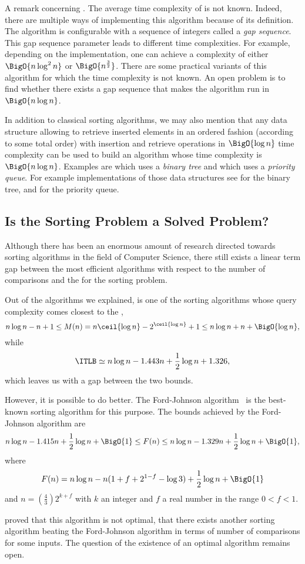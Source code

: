 A remark concerning \shellsort. The average time complexity of \shellsort is not
known. Indeed, there are multiple ways of implementing this
algorithm because of its definition. The \shellsort algorithm is configurable
with a sequence of integers called a \emph{gap sequence}. This gap sequence
parameter leads to different time complexities. For example, depending on the
implementation, one can achieve a complexity of either $\BigO{n \log^2 n}$ or
$\BigO{n^{\frac{3}{2}}}$. There are some practical variants of this algorithm
for which the time complexity is not known. An open problem is to find whether
there exists a gap sequence that makes the algorithm run in $\BigO{n \log
n}$.

In addition to classical sorting algorithms, we may also mention that any data
structure allowing to retrieve inserted elements in an ordered fashion
(according to some total order) with insertion and retrieve operations in
$\BigO{\log n}$ time complexity can be used to build an algorithm whose time
complexity is $\BigO{n \log n}$. Examples are
\binarytreesort which uses a \emph{binary tree} and
\tournamentsort which uses a \emph{priority queue}.
For example implementations of those data structures see
\citet*{sleator:1985} for the binary tree, and
\citet*{leiserson:2001} for the priority queue.


\subsection{Is the Sorting Problem a Solved Problem?}
Although there has been an enormous amount of research directed towards sorting
algorithms in the field of Computer Science, there still exists a linear term
gap between the most efficient algorithms with respect to the number of
comparisons and the \ITLB for the sorting problem.

Out of the algorithms we explained, \mergesort is one of the
sorting algorithms whose query complexity comes closest
to the \ITLB, \ie
\begin{displaymath}
n \log n - n + 1 \le M(n) = n \ceil{\log n} - 2^{\ceil{\log n}} + 1 \le n \log
n + n + \BigO{\log n},
\end{displaymath}
while
\begin{displaymath}
\ITLB \simeq n \log n - 1.443 n + \frac{1}{2} \log n + 1.326,
\end{displaymath}
which leaves us with a  gap between the two bounds.

However, it is possible to do better. The Ford-Johnson
algorithm~\cite{ford:1959,hwang:1969,knuth1998art} is the
best-known sorting algorithm for this purpose. The bounds achieved by the
Ford-Johnson algorithm are
\begin{displaymath}
n \log n - 1.415 n + \frac{1}{2} \log n + \BigO{1} \le F(n) \le n \log n - 1.329 n +
\frac{1}{2} \log n + \BigO{1},
\end{displaymath}
where
\begin{displaymath}
F(n) = n \log n - n ( 1 + f + 2^{1-f} - \log 3) + \frac{1}{2} \log n + \BigO{1}
\end{displaymath}
and \(n = \left(\frac{4}{3}\right) 2^{k+f}\) with \(k\) an integer and \(f\) a real
number in the range \(0 < f < 1\).

\citet*{manacher:1979} proved that this algorithm is not optimal, \ie that
there exists another sorting algorithm beating the Ford-Johnson algorithm in
terms of number of comparisons for some inputs. The question of the existence
of an optimal algorithm remains open.

